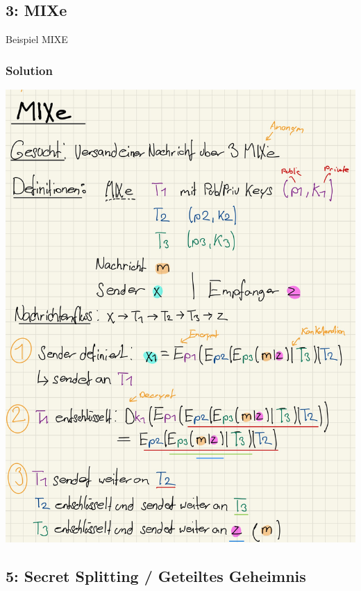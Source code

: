 \documentclass[11pt]{article}
\begin{document}
    \hypertarget{aufgabe-3-mixe}{%
\subsection{3: MIXe}\label{aufgabe-3-mixe}}

Beispiel MIXE

\hypertarget{solution}{%
\subsubsection{Solution}\label{solution}}

\begin{center}
	\includegraphics{img/mixe.jpg}
\end{center}

\newpage

    \hypertarget{aufgabe-5-secret-splitting-geteiltes-geheimnis}{%
\subsection{5: Secret Splitting / Geteiltes
Geheimnis}\label{aufgabe-5-secret-splitting-geteiltes-geheimnis}}
\end{document}
